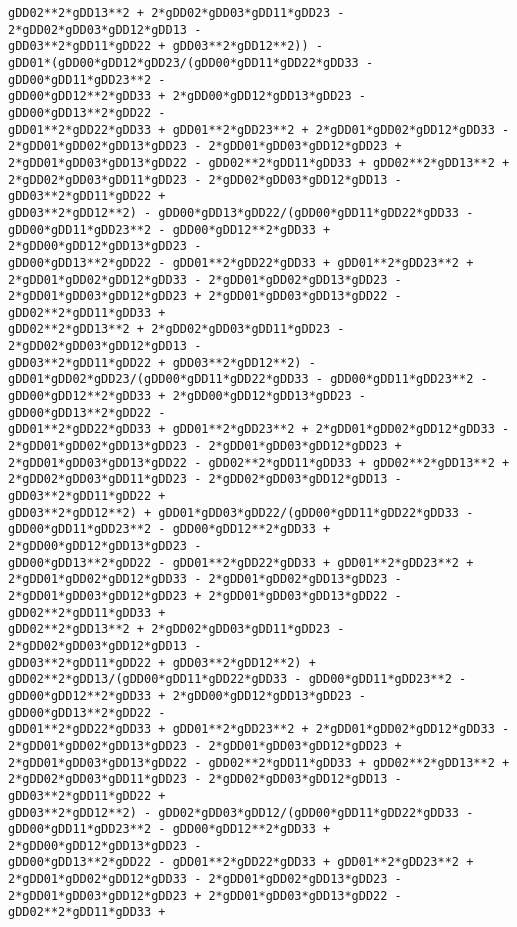 \documentclass[landscape,letterpaper,10pt,english]{article}
\begin{document}
\begin{Verbatim}[commandchars=\\\{\}]
gDD02**2*gDD13**2 + 2*gDD02*gDD03*gDD11*gDD23 - 2*gDD02*gDD03*gDD12*gDD13 -
gDD03**2*gDD11*gDD22 + gDD03**2*gDD12**2)) -
gDD01*(gDD00*gDD12*gDD23/(gDD00*gDD11*gDD22*gDD33 - gDD00*gDD11*gDD23**2 -
gDD00*gDD12**2*gDD33 + 2*gDD00*gDD12*gDD13*gDD23 - gDD00*gDD13**2*gDD22 -
gDD01**2*gDD22*gDD33 + gDD01**2*gDD23**2 + 2*gDD01*gDD02*gDD12*gDD33 -
2*gDD01*gDD02*gDD13*gDD23 - 2*gDD01*gDD03*gDD12*gDD23 +
2*gDD01*gDD03*gDD13*gDD22 - gDD02**2*gDD11*gDD33 + gDD02**2*gDD13**2 +
2*gDD02*gDD03*gDD11*gDD23 - 2*gDD02*gDD03*gDD12*gDD13 - gDD03**2*gDD11*gDD22 +
gDD03**2*gDD12**2) - gDD00*gDD13*gDD22/(gDD00*gDD11*gDD22*gDD33 -
gDD00*gDD11*gDD23**2 - gDD00*gDD12**2*gDD33 + 2*gDD00*gDD12*gDD13*gDD23 -
gDD00*gDD13**2*gDD22 - gDD01**2*gDD22*gDD33 + gDD01**2*gDD23**2 +
2*gDD01*gDD02*gDD12*gDD33 - 2*gDD01*gDD02*gDD13*gDD23 -
2*gDD01*gDD03*gDD12*gDD23 + 2*gDD01*gDD03*gDD13*gDD22 - gDD02**2*gDD11*gDD33 +
gDD02**2*gDD13**2 + 2*gDD02*gDD03*gDD11*gDD23 - 2*gDD02*gDD03*gDD12*gDD13 -
gDD03**2*gDD11*gDD22 + gDD03**2*gDD12**2) -
gDD01*gDD02*gDD23/(gDD00*gDD11*gDD22*gDD33 - gDD00*gDD11*gDD23**2 -
gDD00*gDD12**2*gDD33 + 2*gDD00*gDD12*gDD13*gDD23 - gDD00*gDD13**2*gDD22 -
gDD01**2*gDD22*gDD33 + gDD01**2*gDD23**2 + 2*gDD01*gDD02*gDD12*gDD33 -
2*gDD01*gDD02*gDD13*gDD23 - 2*gDD01*gDD03*gDD12*gDD23 +
2*gDD01*gDD03*gDD13*gDD22 - gDD02**2*gDD11*gDD33 + gDD02**2*gDD13**2 +
2*gDD02*gDD03*gDD11*gDD23 - 2*gDD02*gDD03*gDD12*gDD13 - gDD03**2*gDD11*gDD22 +
gDD03**2*gDD12**2) + gDD01*gDD03*gDD22/(gDD00*gDD11*gDD22*gDD33 -
gDD00*gDD11*gDD23**2 - gDD00*gDD12**2*gDD33 + 2*gDD00*gDD12*gDD13*gDD23 -
gDD00*gDD13**2*gDD22 - gDD01**2*gDD22*gDD33 + gDD01**2*gDD23**2 +
2*gDD01*gDD02*gDD12*gDD33 - 2*gDD01*gDD02*gDD13*gDD23 -
2*gDD01*gDD03*gDD12*gDD23 + 2*gDD01*gDD03*gDD13*gDD22 - gDD02**2*gDD11*gDD33 +
gDD02**2*gDD13**2 + 2*gDD02*gDD03*gDD11*gDD23 - 2*gDD02*gDD03*gDD12*gDD13 -
gDD03**2*gDD11*gDD22 + gDD03**2*gDD12**2) +
gDD02**2*gDD13/(gDD00*gDD11*gDD22*gDD33 - gDD00*gDD11*gDD23**2 -
gDD00*gDD12**2*gDD33 + 2*gDD00*gDD12*gDD13*gDD23 - gDD00*gDD13**2*gDD22 -
gDD01**2*gDD22*gDD33 + gDD01**2*gDD23**2 + 2*gDD01*gDD02*gDD12*gDD33 -
2*gDD01*gDD02*gDD13*gDD23 - 2*gDD01*gDD03*gDD12*gDD23 +
2*gDD01*gDD03*gDD13*gDD22 - gDD02**2*gDD11*gDD33 + gDD02**2*gDD13**2 +
2*gDD02*gDD03*gDD11*gDD23 - 2*gDD02*gDD03*gDD12*gDD13 - gDD03**2*gDD11*gDD22 +
gDD03**2*gDD12**2) - gDD02*gDD03*gDD12/(gDD00*gDD11*gDD22*gDD33 -
gDD00*gDD11*gDD23**2 - gDD00*gDD12**2*gDD33 + 2*gDD00*gDD12*gDD13*gDD23 -
gDD00*gDD13**2*gDD22 - gDD01**2*gDD22*gDD33 + gDD01**2*gDD23**2 +
2*gDD01*gDD02*gDD12*gDD33 - 2*gDD01*gDD02*gDD13*gDD23 -
2*gDD01*gDD03*gDD12*gDD23 + 2*gDD01*gDD03*gDD13*gDD22 - gDD02**2*gDD11*gDD33 +

\end{Verbatim}
\end{document}
